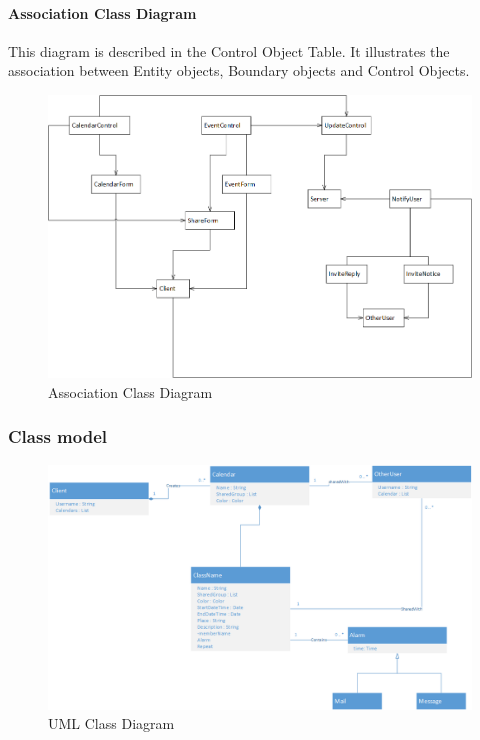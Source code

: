 \paragraph{Association Class Diagram}
This diagram is described in the Control Object Table. It illustrates the association between Entity objects, Boundary objects and Control Objects.
\begin{figure}[ht!]
\centering
\includegraphics[width=160mm]{diagram.png}
\caption{Association Class Diagram \label{overflow}}
\end{figure}

\newpage
\subsubsection*{Class model}
\begin{figure}[ht!]
\centering
\includegraphics[width=160mm]{class.png}
\caption{UML Class Diagram \label{overflow}}
\end{figure}

